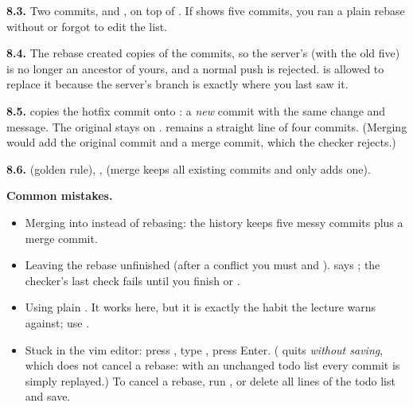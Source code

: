 \textbf{8.3.} Two commits,  and , on top of . If  shows five commits, you ran a plain rebase without  or forgot to edit the list.

\textbf{8.4.} The rebase created copies of the commits, so the server's  (with the old five) is no longer an ancestor of yours, and a normal push is rejected.  is allowed to replace it because the server's branch is exactly where you last saw it.

\textbf{8.5.}  copies the hotfix commit onto : a \emph{new} commit with the same change and message. The original stays on .  remains a straight line of four commits. (Merging  would add the original commit and a merge commit, which the checker rejects.)

\textbf{8.6.}  (golden rule), ,  (merge keeps all existing commits and only adds one).

\textbf{Common mistakes.}
\begin{itemize}
  \item Merging  into  instead of rebasing: the history keeps five messy commits plus a merge commit.
  \item Leaving the rebase unfinished (after a conflict you must  and ).  says ; the checker's last check fails until you finish or .
  \item Using plain . It works here, but it is exactly the habit the lecture warns against; use .
  \item Stuck in the vim editor: press , type , press Enter. ( quits \emph{without saving}, which does not cancel a rebase: with an unchanged todo list every commit is simply replayed.) To cancel a rebase, run , or delete all lines of the todo list and save.
\end{itemize}
